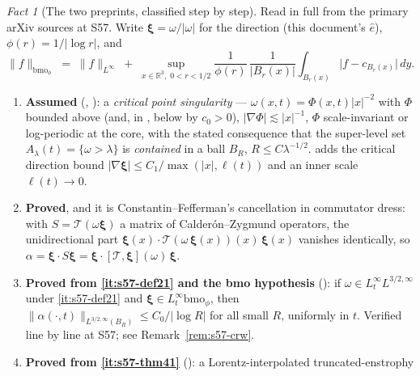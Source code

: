 \documentclass[11pt]{article}
\theoremstyle{definition}
\theoremstyle{remark}
\newtheorem{fact}[theorem]{Fact}
\newcommand{\R}{\mathbb{R}}
\begin{document}
\begin{fact}[The two preprints, classified step by step]\label{fact:s57-source}
  Read in full from the primary arXiv sources at S57. Write
  $\boldsymbol\xi=\omega/|\omega|$ for the direction (this document's
  $\hat e$), $\phi(r)=1/|\log r|$, and
  \begin{equation}\label{eq:s57-bmophi}
    \|f\|_{\mathrm{bmo}_\phi}
      \;=\; \|f\|_{L^\infty}
      \;+\; \sup_{x\in\R^3,\;0<r<1/2}\frac{1}{\phi(r)}\,
        \frac{1}{|B_r(x)|}\int_{B_r(x)}\bigl|f-c_{B_r(x)}\bigr|\,dy .
  \end{equation}
  \begin{enumerate}[label=\textup{(\alph*)},leftmargin=2.4em]
  \item\label{it:s57-def21} \textbf{Assumed} (\cite[Def.~2.1]{Grujic2026Log},
    \cite[Def.~3.1]{Grujic2026Decay}): a \emph{critical point singularity} ---
    $\omega(x,t)=\Phi(x,t)|x|^{-2}$ with $\Phi$ bounded above (and, in
    \cite{Grujic2026Decay}, below by $c_0>0$), $|\nabla\Phi|\lesssim|x|^{-1}$,
    $\Phi$ scale-invariant or log-periodic at the core, with the stated
    consequence that the super-level set $A_\lambda(t)=\{\omega>\lambda\}$ is
    \emph{contained} in a ball $B_R$, $R\leq C\lambda^{-1/2}$.
    \cite{Grujic2026Decay} adds the critical direction bound
    $|\nabla\boldsymbol\xi|\leq C_1/\max(|x|,\ell(t))$ and an inner scale
    $\ell(t)\to0$.
  \item\label{it:s57-cancel} \textbf{Proved}, and it is
    Constantin--Fefferman's cancellation \cite{Constantin1994} in commutator
    dress: with $S=\mathcal{T}(\omega\boldsymbol\xi)$ a matrix of
    Calder\'on--Zygmund operators, the unidirectional part
    $\boldsymbol\xi(x)\cdot\mathcal{T}(\omega\,\boldsymbol\xi(x))(x)\,
    \boldsymbol\xi(x)$ vanishes identically, so
    $\alpha=\boldsymbol\xi\cdot S\boldsymbol\xi
      =\boldsymbol\xi\cdot[\mathcal{T},\boldsymbol\xi](\omega)\,\boldsymbol\xi$.
  \item\label{it:s57-thm41} \textbf{Proved from \ref{it:s57-def21} and the
    bmo hypothesis} (\cite[Thm.~4.1]{Grujic2026Log}): if
    $\omega\in L^\infty_tL^{3/2,\infty}$ under \ref{it:s57-def21} and
    $\boldsymbol\xi\in L^\infty_t\mathrm{bmo}_\phi$, then
    $\|\alpha(\cdot,t)\|_{L^{3/2,\infty}(B_R)}\leq C_0/|\log R|$ for all small
    $R$, uniformly in $t$. Verified line by line at S57; see
    Remark~\ref{rem:s57-crw}.
  \item\label{it:s57-degiorgi} \textbf{Proved from \ref{it:s57-thm41}}
    (\cite[\S5--\S6]{Grujic2026Log}): a Lorentz-interpolated truncated-enstrophy

\end{enumerate}
\end{fact}
\end{document}

